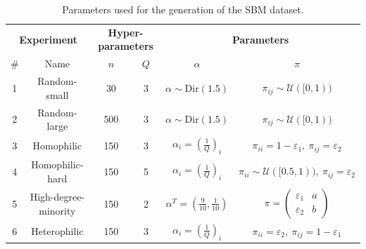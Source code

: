 \documentclass[switch, 12pt]{article}
\begin{document}
\begin{multicols}{2}
    \begin{table}[ht]
        \centering
        \setlength\heavyrulewidth{0.25ex}
        \begin{tabular}{@{}cccccc@{}}
            \toprule
            \multicolumn{2}{c}{\textbf{Experiment}} & \multicolumn{2}{c}{\textbf{Hyper-parameters}} & \multicolumn{2}{c}{\textbf{Parameters}}                                                                                                                                                     \\
            \#                                      & Name                                          & $n$                                     & $Q$                    & $\alpha$                                  & $\pi$                                                                        \\ \midrule
            1                                       & \multicolumn{1}{c|}{Random-small}             & 30                                      & \multicolumn{1}{c|}{3} & $\alpha \sim \text{Dir}(1.5)$             & $\pi_{ij} \sim \mathcal{U}([0, 1))$                                          \\
            2                                       & \multicolumn{1}{c|}{Random-large}             & 500                                     & \multicolumn{1}{c|}{3} & $\alpha \sim \text{Dir}(1.5)$             & $\pi_{ij} \sim \mathcal{U}([0, 1))$                                          \\
            3                                       & \multicolumn{1}{c|}{Homophilic}               & 150                                     & \multicolumn{1}{c|}{3} & $\alpha_i = (\frac{1}{Q})_i$              & $\pi_{ii} = 1-\varepsilon_1, \ \pi_{ij} = \varepsilon_2$                     \\
            4                                       & \multicolumn{1}{c|}{Homophilic-hard}          & 150                                     & \multicolumn{1}{c|}{5} & $\alpha_i = (\frac{1}{Q})_i$              & $\pi_{ii} \sim \mathcal{U}([0.5, 1)), \ \pi_{ij} = \varepsilon_2$            \\
            5                                       & \multicolumn{1}{c|}{High-degree-minority}     & 150                                     & \multicolumn{1}{c|}{2} & $\alpha^T = (\frac{9}{10}, \frac{1}{10})$ & $\pi = \begin{pmatrix} \varepsilon_1 & a \\ \varepsilon_2 & b \end{pmatrix}$ \\
            6                                       & \multicolumn{1}{c|}{Heterophilic}             & 150                                     & \multicolumn{1}{c|}{3} & $\alpha_i = (\frac{1}{Q})_i$              & $\pi_{ii} = \varepsilon_2, \ \pi_{ij} = 1 - \varepsilon_1$                   \\ \bottomrule
        \end{tabular}
        \caption{Parameters used for the generation of the SBM dataset.}
        \label{tab:sbm_parameters}
    \end{table}



\end{multicols}
\end{document}
